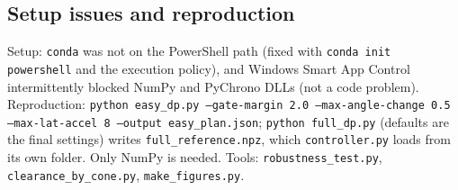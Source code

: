 \documentclass[conference]{IEEEtran}
\begin{document}
\subsection{Setup issues and reproduction}
Setup: \texttt{conda} was not on the PowerShell path (fixed with
\texttt{conda init powershell} and the execution policy), and Windows Smart App
Control intermittently blocked NumPy and PyChrono DLLs (not a code problem).
Reproduction: \texttt{python easy\_dp.py --gate-margin 2.0 --max-angle-change 0.5
--max-lat-accel 8 --output easy\_plan.json}; \texttt{python full\_dp.py}
(defaults are the final settings) writes \texttt{full\_reference.npz}, which
\texttt{controller.py} loads from its own folder. Only NumPy is needed. Tools:
\texttt{robustness\_test.py}, \texttt{clearance\_by\_cone.py},
\texttt{make\_figures.py}.
\end{document}
